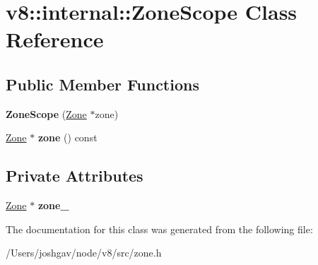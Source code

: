 \hypertarget{classv8_1_1internal_1_1_zone_scope}{}\section{v8\+:\+:internal\+:\+:Zone\+Scope Class Reference}
\label{classv8_1_1internal_1_1_zone_scope}
\subsection*{Public Member Functions}
\begin{DoxyCompactItemize}
\item 
{\bfseries Zone\+Scope} (\hyperlink{classv8_1_1internal_1_1_zone}{Zone} $\ast$zone)\hypertarget{classv8_1_1internal_1_1_zone_scope_ae9b8da0afb3ef968d6d20064c1563916}{}\label{classv8_1_1internal_1_1_zone_scope_ae9b8da0afb3ef968d6d20064c1563916}

\item 
\hyperlink{classv8_1_1internal_1_1_zone}{Zone} $\ast$ {\bfseries zone} () const \hypertarget{classv8_1_1internal_1_1_zone_scope_a234abb38538fb63b2f748e30b813bf28}{}\label{classv8_1_1internal_1_1_zone_scope_a234abb38538fb63b2f748e30b813bf28}

\end{DoxyCompactItemize}
\subsection*{Private Attributes}
\begin{DoxyCompactItemize}
\item 
\hyperlink{classv8_1_1internal_1_1_zone}{Zone} $\ast$ {\bfseries zone\+\_\+}\hypertarget{classv8_1_1internal_1_1_zone_scope_aa1f8fbc65d8f985c2c794752916c259e}{}\label{classv8_1_1internal_1_1_zone_scope_aa1f8fbc65d8f985c2c794752916c259e}

\end{DoxyCompactItemize}


The documentation for this class was generated from the following file\+:\begin{DoxyCompactItemize}
\item 
/\+Users/joshgav/node/v8/src/zone.\+h\end{DoxyCompactItemize}
